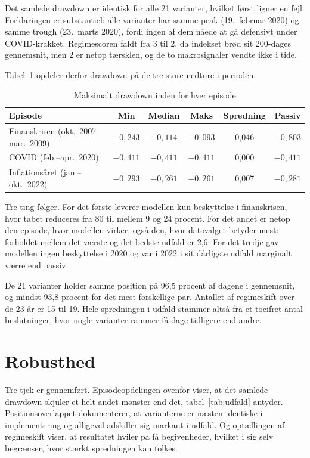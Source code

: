 \documentclass[11pt,a4paper]{article}
\begin{document}
Det samlede drawdown er identisk for alle 21 varianter, hvilket først ligner en
fejl. Forklaringen er substantiel: alle varianter har samme peak
(19.~februar 2020) og samme trough (23.~marts 2020), fordi ingen af dem nåede
at gå defensivt under COVID-krakket. Regimescoren faldt fra 3 til 2, da indekset
brød sit 200-dages gennemsnit, men 2 er netop tærsklen, og de to
makrosignaler vendte ikke i tide.

Tabel~\ref{tab:episoder} opdeler derfor drawdown på de tre store nedture i
perioden.

\begin{table}[htbp]\centering
\caption{Maksimalt drawdown inden for hver episode}
\label{tab:episoder}\small
\begin{tabularx}{0.9\textwidth}{Xccccc}
\toprule
Episode & Min & Median & Maks & Spredning & Passiv \\
\midrule
Finanskrisen (okt.\ 2007--mar.\ 2009) & $-0{,}243$ & $-0{,}114$ & $-0{,}093$ & 0,046 & $-0{,}803$ \\
COVID (feb.--apr.\ 2020)              & $-0{,}411$ & $-0{,}411$ & $-0{,}411$ & 0,000 & $-0{,}411$ \\
Inflationsåret (jan.--okt.\ 2022)     & $-0{,}293$ & $-0{,}261$ & $-0{,}261$ & 0,007 & $-0{,}281$ \\
\bottomrule
\end{tabularx}
\end{table}

Tre ting følger. For det første leverer modellen kun beskyttelse i
finanskrisen, hvor tabet reduceres fra 80 til mellem 9 og 24 procent. For det
andet er netop den episode, hvor modellen virker, også den, hvor datovalget
betyder mest: forholdet mellem det værste og det bedste udfald er 2,6. For det
tredje gav modellen ingen beskyttelse i 2020 og var i 2022 i sit dårligste
udfald marginalt værre end passiv.

De 21 varianter holder samme position på 96,5 procent af dagene i gennemsnit,
og mindst 93,8 procent for det mest forskellige par. Antallet af regimeskift
over de 23 år er 15 til 19. Hele spredningen i udfald stammer altså fra et
tocifret antal beslutninger, hvor nogle varianter rammer få dage tidligere end
andre.

\section{Robusthed}
Tre tjek er gennemført. Episodeopdelingen ovenfor viser, at det samlede
drawdown skjuler et helt andet mønster end det, tabel~\ref{tab:udfald}
antyder. Positionsoverlappet dokumenterer, at varianterne er næsten identiske i
implementering og alligevel adskiller sig markant i udfald. Og optællingen af
regimeskift viser, at resultatet hviler på få begivenheder, hvilket i sig selv
begrænser, hvor stærkt spredningen kan tolkes.
\end{document}
